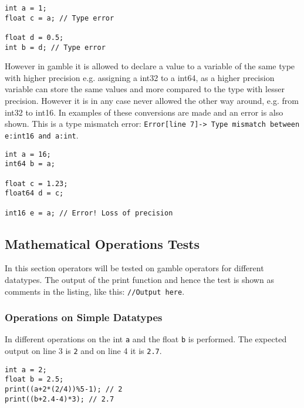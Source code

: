 \begin{lstlisting}[caption={Examples of type incompatibilities \gls{gamble} to demonstrate the type checker.},label={lst:type2},frame=tb]
int a = 1;
float c = a; // Type error

float d = 0.5;
int b = d; // Type error
\end{lstlisting}

However in \gls{gamble} it is allowed to declare a value to a variable of the same type with higher precision e.g. assigning a int32 to a int64, as a higher precision variable can store the same values and more compared to the type with lesser precision.
However it is in any case never allowed the other way around, e.g. from int32 to int16.
In  examples of these conversions are made and an error is also shown.
This is a type mismatch error: \texttt{Error[line    7]-> Type mismatch between e:int16 and a:int}.

\begin{lstlisting}[caption={Examples of type conversions and an error in \gls{gamble} to demonstrate the type checker.},label={lst:type3},frame=tb]
int a = 16;
int64 b = a;

float c = 1.23;
float64 d = c;

int16 e = a; // Error! Loss of precision
\end{lstlisting}

\subsection*{Mathematical Operations Tests}
In this section operators will be tested on \gls{gamble} operators for different datatypes.
The output of the print function and hence the test is shown as comments in the listing, like this: \texttt{//Output here}.

\subsubsection*{Operations on Simple Datatypes}
In  different operations on the int \texttt{a} and the float \texttt{b} is performed.
The expected output on line 3 is \texttt{2} and on line 4 it is \texttt{2.7}.
\begin{lstlisting}[caption={Example of a scope error in \gls{gamble}},label={lst:SimpleOps1},frame=tb]
int a = 2;
float b = 2.5;
print((a+2*(2/4))%5-1); // 2
print((b+2.4-4)*3); // 2.7
\end{lstlisting}

